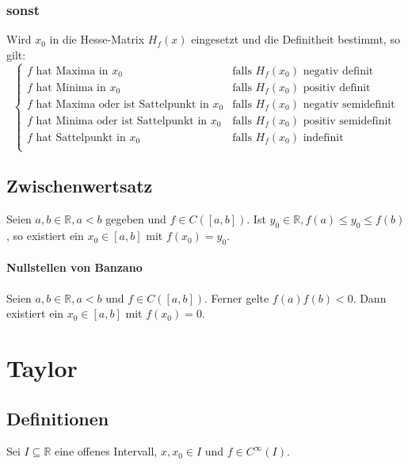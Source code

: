 			\subsubsection{sonst}
				Wird $ x _ 0 $ in die Hesse-Matrix $ H _ f (x) $ eingesetzt und die Definitheit bestimmt, so gilt:
				\begin{equation*}
					\begin{cases}
						f \text{ hat Maxima in } x _ 0                      & \text{falls } H _ f (x _ 0) \text{ negativ definit}     \\
						f \text{ hat Minima in } x _ 0                      & \text{falls } H _ f (x _ 0) \text{ positiv definit}     \\
						f \text{ hat Maxima oder ist Sattelpunkt in } x _ 0 & \text{falls } H _ f (x _ 0) \text{ negativ semidefinit} \\
						f \text{ hat Minima oder ist Sattelpunkt in } x _ 0 & \text{falls } H _ f (x _ 0) \text{ positiv semidefinit} \\
						f \text{ hat Sattelpunkt in } x _ 0                 & \text{falls } H _ f (x _ 0) \text{ indefinit}           \\
					\end{cases}
				\end{equation*}

		\subsection{Zwischenwertsatz}
			Seien $ a, b \in \mathbb{R}, a < b $ gegeben und $ f \in C([a, b]) $. Ist $ y _ 0 \in \mathbb{R}, f(a) \leq y _ 0 \leq f(b) $, so existiert ein $ x _ 0 \in [a, b] $ mit $ f(x _ 0) = y _ 0 $.

			\paragraph{Nullstellen von Banzano}
				Seien $ a, b \in \mathbb{R}, a < b $ und $ f \in C([a, b]) $. Ferner gelte $ f(a)f(b) < 0 $. Dann existiert ein $ x _ 0 \in [a, b] $ mit $ f(x _ 0) = 0 $.

	\section{Taylor}
		\subsection{Definitionen}
			Sei $ I \subseteq \mathbb{R} $ eine offenes Intervall, $ x, x _ 0 \in I $ und $ f \in C ^ \infty (I) $.

